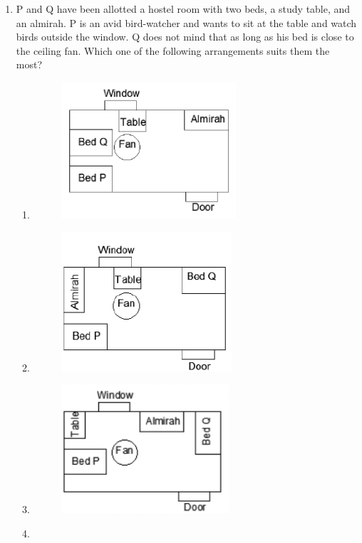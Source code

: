 \documentclass[journal,12pt,onecolumn]{IEEEtran}
\theoremstyle{remark}
\begin{document}
\begin{enumerate}[start=1, label=Q.\arabic*]
    \item P and Q have been allotted a hostel room with two beds, a study table, and an almirah. P is an avid bird-watcher and wants to sit at the table and watch birds outside the window. Q does not mind that as long as his bed is close to the ceiling fan.
    Which one of the following arrangements suits them the most?
    \begin{enumerate}
    \item
        \begin{figure}[H]
            \centering
            \includegraphics[width=0.4\columnwidth]{Figures/q2a.png}
        \end{figure}
    \item
        \begin{figure}[H]
            \centering
            \includegraphics[width=0.4\columnwidth]{Figures/q2b.png}
        \end{figure}
    \item
        \begin{figure}[H]
            \centering
            \includegraphics[width=0.4\columnwidth]{Figures/q2c.png}
        \end{figure}
    \item

\end{enumerate}
\end{enumerate}
\end{document}
